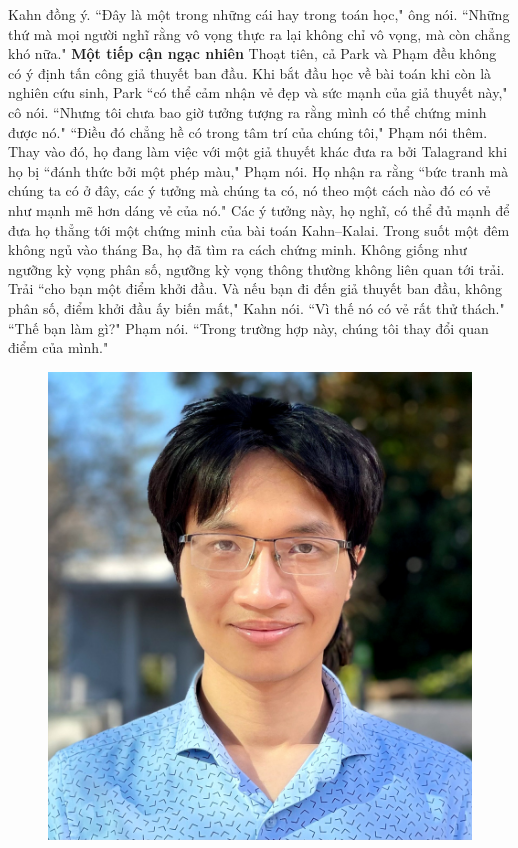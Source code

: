 \begin{multicols}{2}
	\vskip 0.1cm
	Kahn đồng ý. ``Đây là một trong những cái hay trong toán học," ông nói.
	\vskip 0.1cm 
	``Những thứ mà mọi người nghĩ rằng vô vọng thực ra lại không chỉ vô vọng, mà còn chẳng khó nữa."
	\vskip 0.1cm
	\textbf{\color{duongvaotoanhoc}Một tiếp cận ngạc nhiên}
	\vskip 0.1cm
	Thoạt tiên, cả Park và Phạm đều không có ý định tấn công giả thuyết ban đầu. Khi bắt đầu học về bài toán khi còn là nghiên cứu sinh, Park ``có thể cảm nhận vẻ đẹp và sức mạnh của giả thuyết này," cô nói. ``Nhưng tôi chưa bao giờ tưởng tượng ra rằng mình có thể chứng minh được nó."
	\vskip 0.1cm
	``Điều đó chẳng hề có trong tâm trí của chúng tôi," Phạm nói thêm.
	\vskip 0.1cm
	Thay vào đó, họ đang làm việc với một giả thuyết khác đưa ra bởi Talagrand khi họ bị ``đánh thức bởi một phép màu," Phạm nói. Họ nhận ra rằng ``bức tranh mà chúng ta có ở đây, các ý tưởng mà chúng ta có, nó theo một cách nào đó có vẻ như mạnh mẽ hơn dáng vẻ của nó." Các ý tưởng này, họ nghĩ, có thể đủ mạnh để đưa họ thẳng tới một chứng minh của bài toán Kahn--Kalai.
	\vskip 0.1cm
	Trong suốt một đêm không ngủ vào tháng Ba, họ đã tìm ra cách chứng minh.
	\vskip 0.1cm
	Không giống như ngưỡng kỳ vọng phân số, ngưỡng kỳ vọng thông thường không liên quan tới trải. Trải ``cho bạn một điểm khởi đầu. Và nếu bạn đi đến giả thuyết ban đầu, không phân số, điểm khởi đầu ấy biến mất," Kahn nói. ``Vì thế nó có vẻ rất thử thách."
	\vskip 0.1cm
	``Thế bạn làm gì?" Phạm nói. ``Trong trường hợp này, chúng tôi thay đổi quan điểm của mình."
	\begin{figure}[H]
		\vspace*{-5pt}
		\centering
		\captionsetup{labelformat= empty, justification=centering}
		\includegraphics[width= 1\linewidth]{4}

\end{figure}
\end{multicols}
